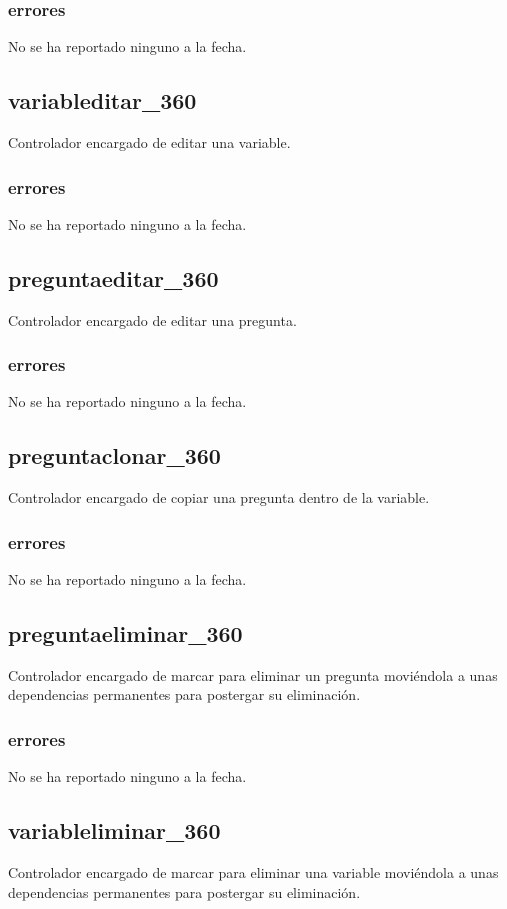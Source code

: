 \documentclass[10pt,a4paper]{book}
\begin{document}
	\subsubsection{errores}
	No se ha reportado ninguno a la fecha.

	\subsection{variableditar\_360}
	Controlador encargado de editar una variable.
	\subsubsection{errores}
	No se ha reportado ninguno a la fecha.

	\subsection{preguntaeditar\_360}
	Controlador encargado de editar una pregunta.
	\subsubsection{errores}
	No se ha reportado ninguno a la fecha.

	\subsection{preguntaclonar\_360}
	Controlador encargado de copiar una pregunta dentro de la variable.
	\subsubsection{errores}
	No se ha reportado ninguno a la fecha.

	\subsection{preguntaeliminar\_360}
	Controlador encargado de marcar para eliminar un pregunta moviéndola a unas dependencias permanentes para postergar su eliminación.
	\subsubsection{errores}
	No se ha reportado ninguno a la fecha.

	\subsection{variableliminar\_360}
	Controlador encargado de marcar para eliminar una variable moviéndola a unas dependencias permanentes para postergar su eliminación.
\end{document}
